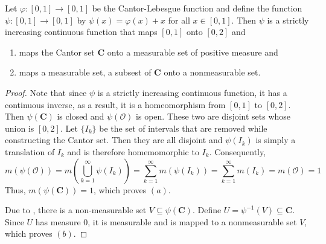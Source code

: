 \begin{theorem}
    Let $\varphi: [0,1]\to[0,1]$ be the Cantor-Lebesgue function and define the function $\psi: [0,1]\to[0,1]$ by $\psi(x) = \varphi(x) + x$ for all $x\in [0,1]$. Then $\psi$ is a strictly increasing continuous function that maps $[0,1]$ onto $[0,2]$ and 
    \begin{enumerate}[label=(\alph*)]
        \item maps the Cantor set $\mathbf C$ onto a measurable set of positive measure and 
        \item maps a measurable set, a subsest of $\mathbf C$ onto a nonmeasurable set.
    \end{enumerate}
\end{theorem}
\begin{proof}
    Note that since $\psi$ is a strictly increasing continuous function, it has a continuous inverse, as a result, it is a homeomorphism from $[0,1]$ to $[0,2]$. Then $\psi(\mathbf C)$ is closed and $\psi(\mathcal O)$ is open. These two are disjoint sets whose union is $[0,2]$. Let $\{I_k\}$ be the set of intervals that are removed while constructing the Cantor set. Then they are all disjoint and $\psi(I_k)$ is simply a translation of $I_k$ and is therefore homemomorphic to $I_k$. Consequently, 
    \begin{equation*}
        m\left(\psi(\mathcal O)\right) = m\left(\bigcup_{k = 1}^\infty \psi(I_k)\right) = \sum_{k = 1}^\infty m(\psi(I_k)) = \sum_{k = 1}^\infty m(I_k) = m(\mathcal O) = 1
    \end{equation*}
    Thus, $m(\psi(\mathbf C)) = 1$, which proves $(a)$.

    Due to , there is a non-measurable set $V\subseteq\psi(\mathbf C)$. Define $U =\psi^{-1}(V)\subseteq\mathbf C$. Since $U$ has measure $0$, it is measurable and is mapped to a nonmeasurable set $V$, which proves $(b)$.
\end{proof}

